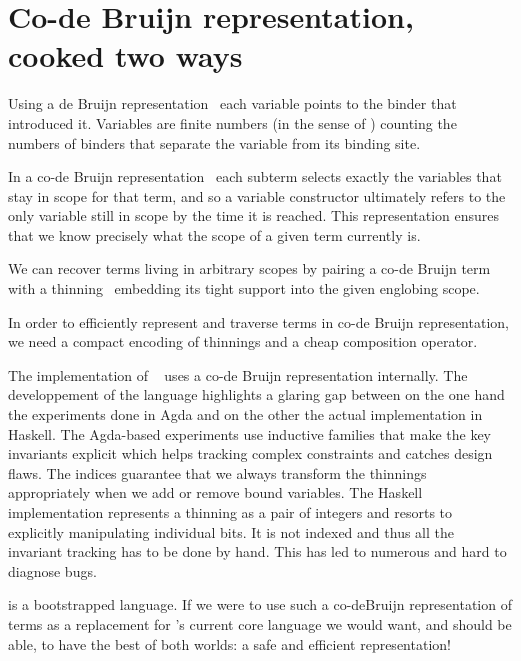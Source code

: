 \section{Co-de Bruijn representation, cooked two ways}\label{sec:codebruijn}


Using a de Bruijn representation~\cite{MANUAL:journals/math/debruijn72} each
variable points to the binder that introduced it. Variables are finite numbers
(in the sense of ) counting the numbers of binders that separate
the variable from its binding site.


In a co-de Bruijn
representation~\cite{DBLP:journals/corr/abs-1807-04085} each subterm
selects exactly the variables that stay in scope for that term,
and so a variable constructor ultimately refers to the only variable still
in scope by the time it is reached.
%
This representation ensures that we know precisely what the scope of a given term
currently is.



We can recover terms living in arbitrary scopes by pairing a co-de Bruijn term
with a thinning~\cite{MANUAL:phd/nott/Chapman09}
embedding its tight support into the given englobing scope.


In order to efficiently represent and traverse terms in co-de Bruijn representation,
we need a compact encoding of thinnings and a cheap composition operator.

The implementation of \typos~\cite{MANUAL:talk/types/Allais22} uses a co-de Bruijn
representation internally. 
%
The developpement of the \typos{} language highlights a glaring gap between on the
one hand the experiments done in Agda and on the other the actual implementation
in Haskell.
%
The Agda-based experiments use inductive families that make the key invariants explicit
which helps tracking complex constraints and catches design flaws. The indices guarantee
that we always transform the thinnings appropriately when we add or remove bound variables.
%
The Haskell implementation represents a thinning as a pair of integers and resorts to
explicitly manipulating individual bits. It is not indexed and thus all the invariant
tracking has to be done by hand. This has led to numerous and hard to diagnose bugs.

\idris{} is a bootstrapped language. If we were to use such a co-deBruijn representation
of terms as a replacement for \idris{}'s current core language we would want, and should
be able, to have the best of both worlds: a safe and efficient representation!
